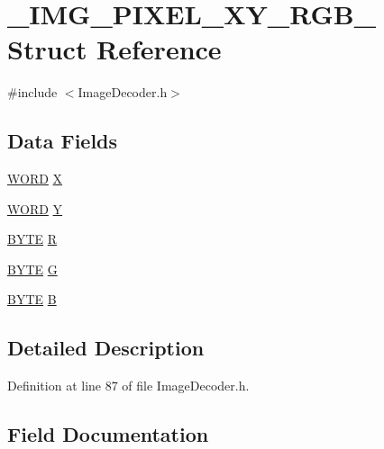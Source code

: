 \hypertarget{struct___i_m_g___p_i_x_e_l___x_y___r_g_b__888}{}\section{\+\_\+\+I\+M\+G\+\_\+\+P\+I\+X\+E\+L\+\_\+\+X\+Y\+\_\+\+R\+G\+B\+\_ Struct Reference}
\label{struct___i_m_g___p_i_x_e_l___x_y___r_g_b__888}


{\ttfamily \#include $<$Image\+Decoder.\+h$>$}

\subsection*{Data Fields}
\begin{DoxyCompactItemize}
\item 
\hyperlink{_generic_type_defs_8h_a2b0e863dadf920709ec53d9088ee7c91}{W\+O\+R\+D} \hyperlink{struct___i_m_g___p_i_x_e_l___x_y___r_g_b__888_a7b0996e32ac615aee22f3b895d45f5c8}{X}
\item 
\hyperlink{_generic_type_defs_8h_a2b0e863dadf920709ec53d9088ee7c91}{W\+O\+R\+D} \hyperlink{struct___i_m_g___p_i_x_e_l___x_y___r_g_b__888_ad83f3cd64de290d13d00032f988ac2c4}{Y}
\item 
\hyperlink{_generic_type_defs_8h_a4ae1dab0fb4b072a66584546209e7d58}{B\+Y\+T\+E} \hyperlink{struct___i_m_g___p_i_x_e_l___x_y___r_g_b__888_af6d12b39a9432881aa3845c1e23a6503}{R}
\item 
\hyperlink{_generic_type_defs_8h_a4ae1dab0fb4b072a66584546209e7d58}{B\+Y\+T\+E} \hyperlink{struct___i_m_g___p_i_x_e_l___x_y___r_g_b__888_ac00126ee70280d9e7e380c77ba446cd9}{G}
\item 
\hyperlink{_generic_type_defs_8h_a4ae1dab0fb4b072a66584546209e7d58}{B\+Y\+T\+E} \hyperlink{struct___i_m_g___p_i_x_e_l___x_y___r_g_b__888_abc9e2377dd2619b51b588323fe9984ea}{B}
\end{DoxyCompactItemize}


\subsection{Detailed Description}


Definition at line 87 of file Image\+Decoder.\+h.



\subsection{Field Documentation}
\hypertarget{struct___i_m_g___p_i_x_e_l___x_y___r_g_b__888_abc9e2377dd2619b51b588323fe9984ea}{}
